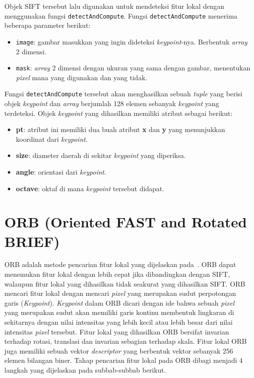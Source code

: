 Objek SIFT tersebut lalu digunakan untuk mendeteksi fitur lokal dengan menggunakan fungsi \texttt{detectAndCompute}. Fungsi \texttt{detectAndCompute} menerima beberapa parameter berikut:
\begin{itemize}
	\item \texttt{image}: gambar masukkan yang ingin dideteksi \textit{keypoint}-nya. Berbentuk \textit{array} 2 dimensi.
	\item \texttt{mask}: \textit{array} 2 dimensi dengan ukuran yang sama dengan gambar, menentukan \textit{pixel} mana yang digunakan dan yang tidak.
\end{itemize}

Fungsi \texttt{detectAndCompute} tersebut akan menghasilkan sebuah \textit{tuple} yang berisi objek \textit{keypoint} dan \textit{array} berjumlah 128 elemen sebanyak \textit{keypoint} yang terdeteksi. Objek \textit{keypoint} yang dihasilkan memiliki atribut sebagai berikut:
\begin{itemize}
	\item \textbf{pt}: atribut ini memiliki dua buah atribut \textbf{x} dan \textbf{y} yang menunjukkan koordinat dari \textit{keypoint}.
	\item \textbf{size}: diameter daerah di sekitar \textit{keypoint} yang diperiksa.
	\item \textbf{angle}: orientasi dari \textit{keypoint}.
	\item \textbf{octave}: oktaf di mana \textit{keypoint} tersebut didapat.
\end{itemize} 

\section{ORB (Oriented FAST and Rotated BRIEF)}
\label{sec:orb}
ORB adalah metode pencarian fitur lokal yang dijelaskan pada~\cite{rublee2011orb}. ORB dapat menemukan fitur lokal dengan lebih cepat jika dibandingkan dengan SIFT, walaupun fitur lokal yang dihasilkan tidak seakurat yang dihasilkan SIFT. ORB mencari fitur lokal dengan mencari \textit{pixel} yang merupakan sudut perpotongan garis (\textit{Keypoint}). \textit{Keypoint} dalam ORB dicari dengan ide bahwa sebuah \textit{pixel} yang merupakan sudut akan memiliki garis kontinu membentuk lingkaran di sekitarnya dengan nilai intensitas yang lebih kecil atau lebih besar dari nilai intensitas \textit{pixel} tersebut. Fitur lokal yang dihasilkan ORB bersifat invarian terhadap rotasi, translasi dan invarian sebagian terhadap skala. Fitur lokal ORB juga memiliki sebuah vektor \textit{descriptor} yang berbentuk vektor sebanyak 256 elemen bilangan biner. Tahap pencarian fitur lokal pada ORB dibagi menjadi 4 langkah yang dijelaskan pada subbab-subbab berikut.

